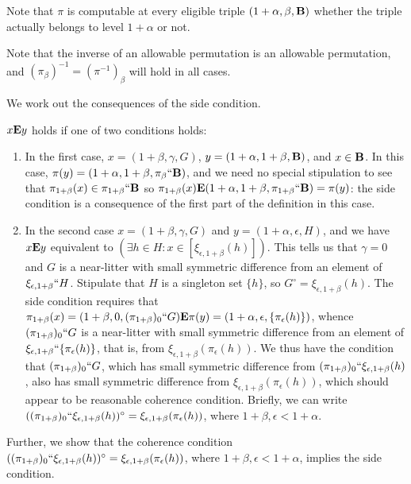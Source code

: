 \documentclass[12pt]{article}
\begin{document}
Note that $\pi$ is computable at every eligible triple $(1+\alpha,\beta,{\bf B})$ whether the triple actually belongs to level $1+\alpha$ or not.

Note that the inverse of an allowable permutation is an allowable permutation, and $(\pi_{\beta})^{-1} = (\pi^{-1})_\beta$ will hold in all cases.

We work out the consequences of the side condition.

$x {\bf E} y$ holds if one of two conditions holds:

\begin{enumerate}

\item  In the first case, $x=(1+\beta,\gamma,G)$, $y = (1+\alpha,1+\beta,{\bf B})$, and $x \in {\bf B}$.  In this case, $\pi(y) = (1+\alpha,1+\beta,\pi_\beta``{\bf B})$,
and we need no special stipulation to see that $\pi_{1+\beta}(x) \in \pi_{1+\beta}``{\bf B}$ so $\pi_{1+\beta}(x) {\bf E}  (1+\alpha,1+\beta,\pi_{1+\beta}``{\bf B}) = \pi(y)$:  the side condition is a consequence of the first part of the definition in this case.

\item  In the second case $x=(1+\beta,\gamma,G)$ and $y=(1+\alpha,\epsilon,H)$, and we have $x {\bf E} y$ equivalent to $(\exists h \in H:x \in [\xi_{\epsilon,1+\beta}(h)])$.
This tells us that $\gamma=0$ and $G$ is a near-litter with small symmetric difference from an element of $\xi_{\epsilon,1+\beta}``H$.  Stipulate that $H$ is a singleton set
$\{h\}$, so $G^{\circ} = \xi_{\epsilon,1+\beta}(h)$.   The side condition requires that $\pi_{1+\beta}(x) = (1+\beta,0,(\pi_{1+\beta})_0``G) {\bf E} \pi(y) = (1+\alpha,\epsilon,\{\pi_\epsilon(h)\})$, whence
$(\pi_{1+\beta})_0``G$ is a near-litter with small symmetric difference from an element of $\xi_{\epsilon,1+\beta}``\{\pi_\epsilon(h)\}$, that is, from $\xi_{\epsilon,1+\beta}(\pi_\epsilon(h))$.   We thus have the condition that  $(\pi_{1+\beta})_0``G$, which has small symmetric difference from $(\pi_{1+\beta})_0``\xi_{\epsilon,1+\beta}(h)$, also  has small symmetric difference from  $\xi_{\epsilon,1+\beta}(\pi_\epsilon(h))$, which should appear to be reasonable coherence condition.  Briefly, we can write  $((\pi_{1+\beta})_0``\xi_{\epsilon,1+\beta}(h))^{\circ}=\xi_{\epsilon,1+\beta}(\pi_\epsilon(h))$, where $1+\beta, \epsilon <1+\alpha$.

\end{enumerate}

Further, we show that the coherence condition $((\pi_{1+\beta})_0``\xi_{\epsilon,1+\beta}(h))^{\circ}=\xi_{\epsilon,1+\beta}(\pi_\epsilon(h))$, where $1+\beta, \epsilon <1+\alpha$, implies the side condition.
\end{document}
